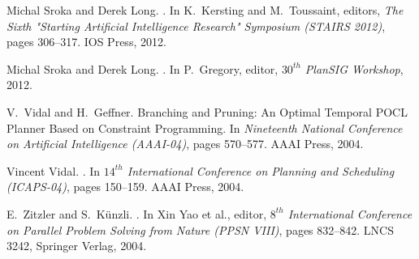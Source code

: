 \documentclass[letterpaper]{article}
\begin{document}
\begin{thebibliography}{}
Michal Sroka and Derek Long.
.
\newblock In K.~Kersting and M.~Toussaint, editors, {\em The Sixth "Starting
  Artificial Intelligence Research" Symposium (STAIRS 2012)}, pages 306--317.
  IOS Press, 2012.

Michal Sroka and Derek Long.
.
\newblock In P.~Gregory, editor, {\em $30^{th}$ PlanSIG Workshop}, 2012.

V.~Vidal and H.~Geffner.
\newblock Branching and {P}runing: {A}n {O}ptimal {T}emporal {POCL} {P}lanner
  {B}ased on {C}onstraint {P}rogramming.
\newblock In {\em Nineteenth National Conference on Artificial Intelligence
  (AAAI-04)}, pages 570--577. AAAI Press, 2004.

Vincent Vidal.
.
\newblock In {\em $14^{th}$ International Conference on Planning and Scheduling
  (ICAPS-04)}, pages 150--159. AAAI Press, 2004.

E.~Zitzler and S.~K{\"u}nzli.
.
\newblock In {Xin Yao et al.}, editor, {\em $8^{th}$ International Conference
  on Parallel Problem Solving from Nature (PPSN VIII)}, pages 832--842. LNCS
  3242, Springer Verlag, 2004.

\end{thebibliography}
\end{document}
